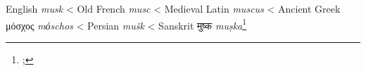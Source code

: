 \begin{etymology}\label{ety:musk}
English \textit{musk}
< Old French \textit{musc}
< Medieval Latin \textit{muscus}
< Ancient Greek {μόσχος } \textit{mόschos}
< Persian \textit{mušk}
< Sanskrit {मुष्क } \textit{muṣka}\footnote{; }
\end{etymology}